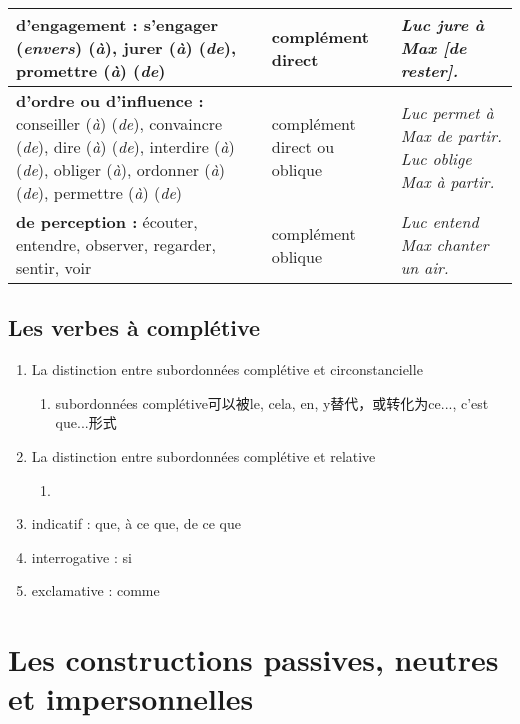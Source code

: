 \documentclass[UTF8]{report}
\begin{document}
\begin{table}[H]
\begin{adjustbox}{max width=\textwidth}
\begin{tabular}{| L{6.8cm} | L{2.5cm} | L{5.5cm} |}
        \hline
        \textbf{d’engagement :} \newline s’engager (\textit{envers}) (\textit{à}), jurer (\textit{à}) (\textit{de}), promettre (\textit{à}) (\textit{de}) & complément direct & \textit{Luc jure à Max [de rester].} \\
        \hline
        \textbf{d’ordre ou d’influence :} \newline conseiller (\textit{à}) (\textit{de}), convaincre (\textit{de}), dire (\textit{à}) (\textit{de}), interdire (\textit{à}) (\textit{de}), obliger (\textit{à}), ordonner (\textit{à}) (\textit{de}), permettre (\textit{à}) (\textit{de}) & complément direct ou oblique & \textit{Luc permet à Max de partir.} \newline \textit{Luc oblige Max à partir.} \\
        \hline
        \textbf{de perception :} \newline écouter, entendre, observer, regarder, sentir, voir & complément oblique & \textit{Luc entend Max chanter un air.} \\
        \hline
        \end{tabular}
    \end{adjustbox}
\end{table}

\newpage
\subsection{Les verbes à complétive}
\begin{enumerate}
    \item La distinction entre subordonnées complétive et circonstancielle
    \begin{enumerate}
        \item subordonnées complétive可以被le, cela, en, y替代，或转化为ce..., c’est que...形式
    \end{enumerate}
    \item La distinction entre subordonnées complétive et relative
    \begin{enumerate}
        \item 
    \end{enumerate}
    \item indicatif : que, à ce que, de ce que
    \item interrogative : si
    \item exclamative : comme
\end{enumerate}

\section{Les constructions passives, neutres et impersonnelles}
\end{document}
